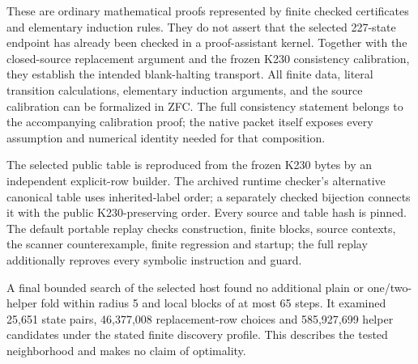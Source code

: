 These are ordinary mathematical proofs represented by finite checked
certificates and elementary induction rules.  They do not assert that the
selected 227-state endpoint has already been checked in a proof-assistant
kernel.  Together with the closed-source replacement argument and the frozen
K230 consistency calibration, they establish the intended blank-halting
transport.  All finite data, literal transition calculations, elementary
induction arguments, and the source calibration can be formalized in ZFC.  The
full consistency statement belongs to the accompanying calibration proof; the
native packet itself exposes every assumption and numerical identity needed
for that composition.

The selected public table is reproduced from the frozen K230 bytes by an
independent explicit-row builder.  The archived runtime checker's alternative
canonical table uses inherited-label order; a separately checked bijection
connects it with the public K230-preserving order.  Every source and table hash
is pinned.  The default portable replay checks construction, finite blocks,
source contexts, the scanner counterexample, finite regression and startup;
the full replay additionally reproves every symbolic instruction and guard.

A final bounded search of the selected host found no additional plain or
one/two-helper fold within radius 5 and local blocks of at most 65 steps.  It
examined 25,651 state pairs, 46,377,008 replacement-row choices and 585,927,699
helper candidates under the stated finite discovery profile.  This describes
the tested neighborhood and makes no claim of optimality.
